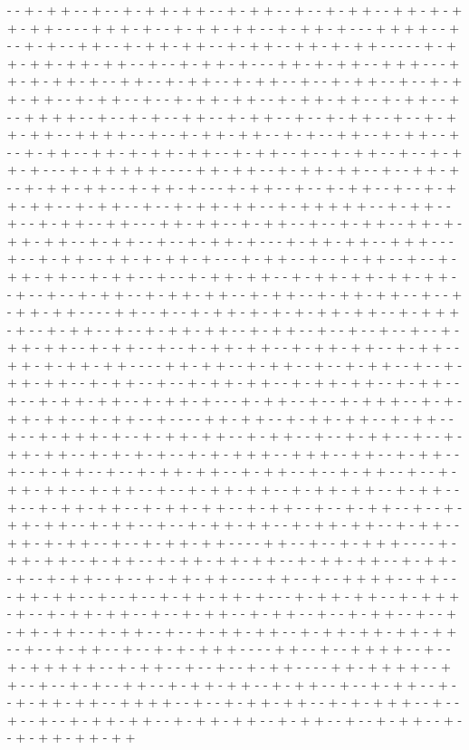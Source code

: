 - - + - + + - - + - - + - + + - + + - - + - + + - - + - - + - + + - - + + - + - + + - + + - - - - + + + - + - - + - + + - + + - - + - + + - + - - - + + + + - - + - - + - + - - + + - - + - + + - + + - - + - + + - - + + - + - + + - - - - - + - + + - + + - + + - + + - - + - - + - + + - + - - - + + - + - + + - - + + + - - - + + - + - + + - + - - + + - - + - + + - - + - + + - - + - - + - + + - - + - - + - + + - + + - - + - + + - - + - - + - + + - + + - - + - + + - + + - - + - + + - - + - - + + + + - - + - - + - + - - + + - - + - + + - - + - - + - + + - - + - - + - + + - + + - - + + + + - - + - - + - + + - + + - - + - + - - + + - - + - + + - - + - - + - + + - - + + - + - + + - + + - - + - + + - - + - - + - + + - - + - - + - + + - + - - - + - + + + + + - - - - + + - + + - - + - + + - + + - - + - - + + - + - - + - + + - + + - - + - + + - + - - - + - + + - - + - - + - + + - - + - - + - + + - + + - - + - + + - - + - - + - + + - + + - - + - + + + + + - - + - + + - - + - - + - + + - - + + - - - + + - + + - - + - + + - - + - - + - + + - - + + - + - + + - + + - - + - + + - - + - - + - + + - + - - - + - + + - + + - - + + + - - - + - - + - + + - - + + - + - + + - + - - - + - + + - - + - - + - + + - - + - - + - + + - + + - - + - + + - - + - - + - + + - + + - - + - + + - + + - + + - + + - - + - - + - - + - + + - - + - + + - + + - - + - + + - - + - + + - + + - - + - - + - + + - + + - - - - + + - - + - - + - + + - + - + - + - + + - + + - - + - + + + - + - - + - + + - - + - - + - + + - + + - - + - + + - - + - - + - - + - - + - - + - + + - + + - - + - + + - - + - - + - + + - + + - - + - + + - + + - - + - + + - - + + - + - + + - + + - - - - + + - + + - - + - + + - - + - - + - + + - - + - - + - + + - + + - - + - + + - - + - - + - + + - + + - - + - + + - + + - - + - + + - - + - - + - + + - + + - - + - + + - + - - - + - + + - - + - - + - + + + - - + - + - + + - + + - - + - + + - - + - - - - + + - + + - - + - + + - + + - - + - + + - - + - - + - + + + - + - - + - + + - + + - - + - + + - - + - - + - + + - - + - - + - + + - + + - - + - + - + - + - - + - + - + + + - - + + + - - + + - - + - + + - - + - - + - + + - - + - - + - + + - + + - - + - + + - - + - - + - + + - - + - - + - + + - + + - - + - + + - - + - - + - + + - + + - - + - + + - + + - - + - + + - - + - - + - + + - + + - - + - + + - + + - - + - + + - - + - - + - + + - - + - - + - + + - + + - - + - + + - - + - - + - + + - + + - - + - + + - + + - - + - + + - - + + - + - + + - - + - - + - + + - + + - - - - + + - - + - - + - + + + - - - - + - + + - + + - - + - + + - - + - + + - + + - + + - - + - + + - + + - - + - + + - - + - - + - + + - - + - - + - + + - + + - - - - + + - - + - - + + + + - - + + - - - + + - + + - - + - - + - - + - + + - + + - + - - - + - + + - + + - - + - + + + - + - - + - + + - + + - - + - - + - + + - - + - + + - - + - - + - + + - - + - - + - + + - + + - - + - + + - - + - - + - + + - + + - - + - + + - + + - + + - + + - - + - - + - + + - - + - - + - + - + + + - - - - + + - - + - - + + + + - - + - - + - + + + + + - - + - + + - - + - - + - - + - + + - - - - + + - + + + + - - + + - - + - - + - + - - + + - - + - + + - + + - - + - + + - - + - - + - + + - - + - - + - + + - + + - - + + + + - - + - - + - + + - + + - - + - + - + + + - - + - - + - - + - - + - + + - + + - - + - + + - + + - - + - + + - - + - - + - + + - - + - - + - + + - + + - + + 